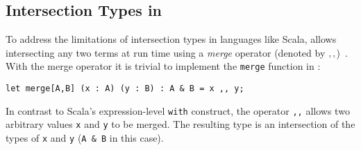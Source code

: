 

\subsection{Intersection Types in \name}


To address the limitations of intersection types in languages like
Scala, \name allows intersecting any two terms at run time using a
\emph{merge} operator (denoted by $ ,, $)~\cite{dunfield2014elaborating}.  With the merge
operator it is trivial to implement the \lstinline{merge} function in \name:

\begin{lstlisting}
let merge[A,B] (x : A) (y : B) : A & B = x ,, y;
\end{lstlisting}

\noindent In contrast to Scala's expression-level \lstinline{with}
construct, the operator \lstinline{,,} allows two arbitrary values \lstinline{x}
and \lstinline{y} to be merged. The resulting type is an
intersection of the types of  \lstinline{x}
and \lstinline{y} (\lstinline{A & B} in this case).

